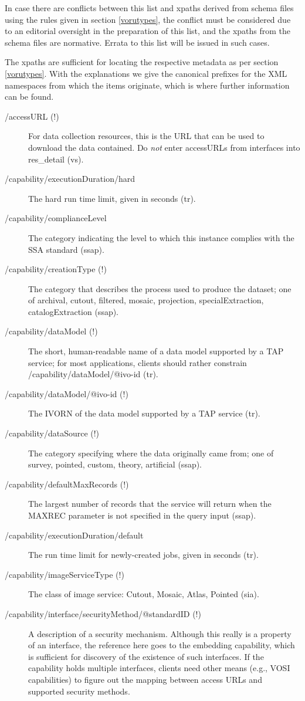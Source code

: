 \documentclass[11pt,a4paper]{ivoa}
\begin{document}
In case there are conflicts between this list and xpaths derived 
from schema files using the rules given in section \ref{vorutypes}, the conflict must be considered due to an
editorial oversight in the preparation of this list, and the xpaths from the
schema files are normative.  Errata to this list will be issued in such
cases.

The xpaths are sufficient for locating the respective metadata as per
section \ref{vorutypes}.  With the explanations we
give the canonical prefixes for the XML namespaces from which the items
originate, which is where further information can be found.


\begin{description}
\item[/accessURL (!)]For data collection resources, this is
the URL that can be used to download the data contained.  Do
\emph{not} enter accessURLs from interfaces into res\_detail (vs).
\item[/capability/executionDuration/hard]The hard run time limit, given in seconds (tr).
\item[/capability/complianceLevel]The category indicating the level to which this instance complies with the SSA standard (ssap).
\item[/capability/creationType (!)]The category that describes the process used to produce the dataset; one of archival, cutout, filtered, mosaic, projection, specialExtraction, catalogExtraction (ssap).
\item[/capability/dataModel (!)]The short, human-readable name of a data model supported by a TAP service; for most applications, clients should rather constrain /capability/dataModel/@ivo-id (tr).  
\item[/capability/dataModel/@ivo-id (!)]The IVORN of the data model supported by a TAP service (tr).
\item[/capability/dataSource (!)]The category specifying where the data originally came from; one of survey, pointed, custom, theory, artificial (ssap).
\item[/capability/defaultMaxRecords (!)]The largest number of records that the service will return when the MAXREC parameter is not specified in the query input (ssap).
\item[/capability/executionDuration/default]The run time limit for newly-created jobs, given in seconds (tr).
\item[/capability/imageServiceType (!)]The class of image service: Cutout, Mosaic, Atlas, Pointed (sia).
\item[/capability/interface/securityMethod/@standardID (!)]A description of a security mechanism.  Although this really is a property of an interface, the reference here goes to the embedding capability, which is sufficient for discovery of the existence of such interfaces.  If the capability holds multiple interfaces, clients need other means (e.g., VOSI capabilities) to figure out the mapping between access URLs and supported security methods.

\end{description}
\end{document}
